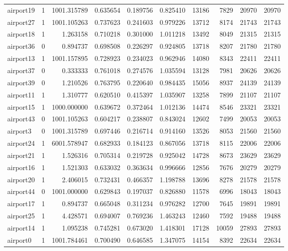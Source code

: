 \begin{longtable}{|l|r|r|r|r|r|r|r|r|r|}
airport19 & 1 & 1001.315789 & 0.635654 & 0.189756 & 0.825410 & 13186 & 7829 & 20970 & 20970 \\
airport27 & 1 & 1001.105263 & 0.737623 & 0.241603 & 0.979226 & 13712 & 8174 & 21743 & 21743 \\
airport18 & 1 & 1.263158 & 0.710218 & 0.301000 & 1.011218 & 13492 & 8049 & 21315 & 21315 \\
airport36 & 0 & 0.894737 & 0.698508 & 0.226297 & 0.924805 & 13718 & 8207 & 21780 & 21780 \\
airport13 & 1 & 1001.157895 & 0.728923 & 0.234023 & 0.962946 & 14080 & 8343 & 22411 & 22411 \\
airport37 & 0 & 0.333333 & 0.761018 & 0.274576 & 1.035594 & 13128 & 7981 & 20626 & 20626 \\
airport39 & 0 & 1.210526 & 0.763795 & 0.220640 & 0.984435 & 15056 & 8937 & 24139 & 24139 \\
airport11 & 1 & 1.310777 & 0.620510 & 0.415397 & 1.035907 & 13258 & 7899 & 21107 & 21107 \\
airport15 & 1 & 1000.000000 & 0.639672 & 0.372464 & 1.012136 & 14474 & 8546 & 23321 & 23321 \\
airport43 & 0 & 1001.105263 & 0.604217 & 0.238807 & 0.843024 & 12602 & 7499 & 20053 & 20053 \\
airport3 & 0 & 1001.315789 & 0.697446 & 0.216714 & 0.914160 & 13526 & 8053 & 21560 & 21560 \\
airport24 & 1 & 6001.578947 & 0.682933 & 0.184123 & 0.867056 & 13718 & 8115 & 22006 & 22006 \\
airport21 & 1 & 1.526316 & 0.705314 & 0.219728 & 0.925042 & 14728 & 8673 & 23629 & 23629 \\
airport16 & 1 & 1.521303 & 0.633032 & 0.363634 & 0.996666 & 12856 & 7676 & 20279 & 20279 \\
airport20 & 1 & 2.406015 & 0.732431 & 0.466357 & 1.198788 & 13696 & 8278 & 21578 & 21578 \\
airport44 & 0 & 1001.000000 & 0.629843 & 0.197037 & 0.826880 & 11578 & 6996 & 18043 & 18043 \\
airport17 & 1 & 0.894737 & 0.665048 & 0.311234 & 0.976282 & 12700 & 7645 & 19891 & 19891 \\
airport25 & 1 & 4.428571 & 0.694007 & 0.769236 & 1.463243 & 12460 & 7592 & 19488 & 19488 \\
airport14 & 1 & 1.095238 & 0.745281 & 0.673020 & 1.418301 & 17128 & 10059 & 27893 & 27893 \\
airport0 & 1 & 1001.784461 & 0.700490 & 0.646585 & 1.347075 & 14154 & 8392 & 22634 & 22634 \\

\end{longtable}
